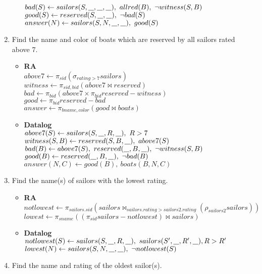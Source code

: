\documentclass{article}
\newcommand{\anyvar}{\underline{\hspace{0.8em}}}
\newcommand{\RA}{\textbf{RA}}
\newcommand{\DL}{\textbf{Datalog}}
\begin{document}
\begin{enumerate}
\begin{itemize}
	$ bad(S) \gets sailors(S, \anyvar, \anyvar, \anyvar),\ allred(B),\ \neg witness(S, B) $ \\
	$ good(S) \gets reserved(S, \anyvar, \anyvar),\ \neg bad(S) $ \\
	$ answer(N) \gets sailors(S, N, \anyvar, \anyvar),\ good(S) $
	\end{itemize}
\item Find the name and color of boats which are reserved by all sailors rated above 7.
	\begin{itemize}
	\item \RA \\
	$ above7 \gets \pi_{sid}(\sigma_{rating > 7} sailors) $ \\
	$ witness \gets \pi_{sid, bid}(above7 \bowtie reserved) $ \\
	$ bad \gets \pi_{bid}(above7 \times \pi_{bid}reserved - witness) $ \\
	$ good \gets \pi_{bid}reserved - bad$ \\
	$ answer \gets \pi_{bname, color}(good \bowtie boats)$
	\item \DL \\
	$ above7(S) \gets sailors(S, \anyvar, R, \anyvar), \ R > 7$ \\
	$ witness(S, B) \gets reserved(S, B, \anyvar),\ above7(S) $ \\
	$ bad(B) \gets above7(S),\ reserved(\anyvar, B, \anyvar),\ \neg witness(S, B) $ \\
	$ good(B) \gets reserved(\anyvar, B, \anyvar),\ \neg bad(B) $ \\
	$ answer(N, C) \gets good(B),\ boats(B, N, C) $
	\end{itemize}
\item Find the name(s) of sailors with the lowest rating.
	\begin{itemize}
	\item \RA \\
	$ notlowest \gets \pi_{sailors.sid}(sailors \bowtie_{sailors.rating > sailors2.rating} (\rho_{sailors2} sailors)) $ \\
	$ lowest \gets \pi_{sname}((\pi_{sid}sailors - notlowest) \bowtie sailors) $
	\item \DL \\
	$ notlowest(S) \gets sailors(S, \anyvar, R, \anyvar), \ sailors(S', \anyvar, R', \anyvar), R > R' $ \\
	$ lowest(N) \gets sailors(S, N, \anyvar, \anyvar), \ \neg notlowest(S) $
	\end{itemize}
\item Find the name and rating of the oldest sailor(s).

\end{enumerate}
\end{document}
